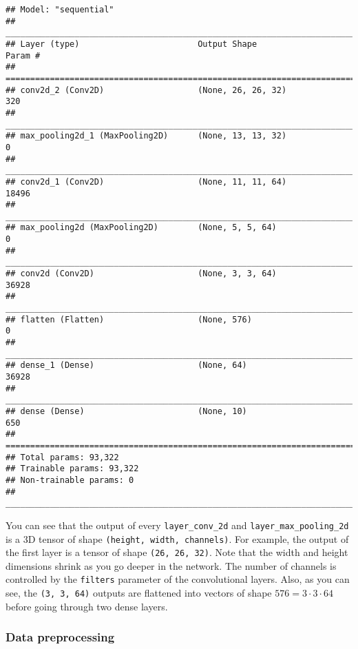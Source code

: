 \documentclass[
  a4paper,
]{article}
\begin{document}
\begin{verbatim}
## Model: "sequential"
## ________________________________________________________________________________
## Layer (type)                        Output Shape                    Param #     
## ================================================================================
## conv2d_2 (Conv2D)                   (None, 26, 26, 32)              320         
## ________________________________________________________________________________
## max_pooling2d_1 (MaxPooling2D)      (None, 13, 13, 32)              0           
## ________________________________________________________________________________
## conv2d_1 (Conv2D)                   (None, 11, 11, 64)              18496       
## ________________________________________________________________________________
## max_pooling2d (MaxPooling2D)        (None, 5, 5, 64)                0           
## ________________________________________________________________________________
## conv2d (Conv2D)                     (None, 3, 3, 64)                36928       
## ________________________________________________________________________________
## flatten (Flatten)                   (None, 576)                     0           
## ________________________________________________________________________________
## dense_1 (Dense)                     (None, 64)                      36928       
## ________________________________________________________________________________
## dense (Dense)                       (None, 10)                      650         
## ================================================================================
## Total params: 93,322
## Trainable params: 93,322
## Non-trainable params: 0
## ________________________________________________________________________________
\end{verbatim}

You can see that the output of every \texttt{layer\_conv\_2d} and
\texttt{layer\_max\_pooling\_2d} is a 3D tensor of shape
\texttt{(height,\ width,\ channels)}. For example, the output of the
first layer is a tensor of shape \texttt{(26,\ 26,\ 32)}. Note that the
width and height dimensions shrink as you go deeper in the network. The
number of channels is controlled by the \texttt{filters} parameter of
the convolutional layers. Also, as you can see, the
\texttt{(3,\ 3,\ 64)} outputs are flattened into vectors of shape
\(576=3\cdot 3\cdot 64\) before going through two dense layers.

\hypertarget{data-preprocessing}{%
\subsubsection{Data preprocessing}\label{data-preprocessing}}
\end{document}

